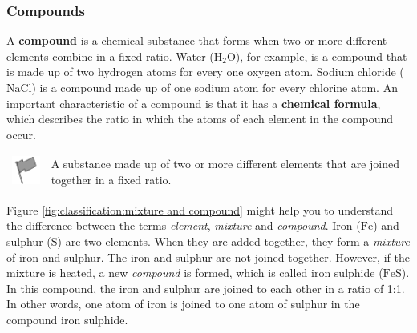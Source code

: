             \subsubsection{ Compounds}
            \nopagebreak
        \label{m38708*id63363}A \textbf{compound} is a chemical substance that forms when two or more different elements combine in a fixed ratio. Water ($\mathrm{H}{}_{2}\mathrm{O}$), for example, is a compound that is made up of two hydrogen atoms for every one oxygen atom. Sodium chloride ($\mathrm{NaCl}$) is a compound made up of one sodium atom for every chlorine atom. An important characteristic of a compound is that it has a \textbf{chemical formula}, which describes the ratio in which the atoms of each element in the compound occur.\par 
\label{m38708*fhsst!!!underscore!!!id201}\begin{definition}
	  \begin{tabular*}{15 cm}{m{15 mm}m{}}
	\hspace*{-50pt}  \includegraphics[width=0.5in]{col11305.imgs/psflag2.png}   & \Definition{   \label{id2406453}\textbf{ Compound }} { \label{m38708*meaningfhsst!!!underscore!!!id201}
        A substance made up of two or more different elements that are joined together in a fixed ratio.
         } 
      \end{tabular*}
      \end{definition}
        \label{m38708*id63410} Figure \ref{fig:classification:mixture and compound} might help you to understand the difference between the terms \textsl{element}, \textsl{mixture} and \textsl{compound}. Iron ($\mathrm{Fe}$) and sulphur ($\mathrm{S}$) are two elements. When they are added together, they form a \textsl{mixture} of iron and sulphur. The iron and sulphur are not joined together. However, if the mixture is heated, a new \textsl{compound} is formed, which is called iron sulphide ($\mathrm{FeS}$). In this compound, the iron and sulphur are joined to each other in a ratio of 1:1. In other words, one atom of iron is joined to one atom of sulphur in the compound iron sulphide.\par 
    \setcounter{subfigure}{0}
